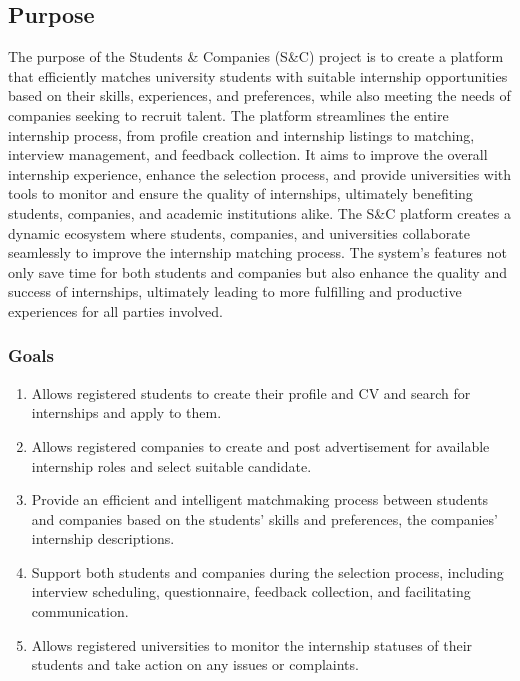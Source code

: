 \subsection{Purpose}
The purpose of the Students \& Companies (S\&C) project is to create a platform that efficiently matches university students with suitable internship opportunities based on their skills, experiences, and preferences, while also meeting the needs of companies seeking to recruit talent. The platform streamlines the entire internship process, from profile creation and internship listings to matching, interview management, and feedback collection. It aims to improve the overall internship experience, enhance the selection process, and provide universities with tools to monitor and ensure the quality of internships, ultimately benefiting students, companies, and academic institutions alike.
\newline The S\&C platform creates a dynamic ecosystem where students, companies, and universities collaborate seamlessly to improve the internship matching process. The system's features not only save time for both students and companies but also enhance the quality and success of internships, ultimately leading to more fulfilling and productive experiences for all parties involved.
\subsubsection{Goals}
\begin{enumerate}[label=G{\arabic*}]
\item
Allows registered students to create their profile and CV and search for internships and apply to them.
\item
Allows registered companies to create and post advertisement for available internship roles and select suitable candidate.
\item 
Provide an efficient and intelligent matchmaking process between students and companies based on the students' skills and preferences, the companies' internship descriptions.
\item
Support both students and companies during the selection process, including interview scheduling, questionnaire, feedback collection, and facilitating communication.
\item
Allows registered universities to monitor the internship statuses of their students and take action on any issues or complaints.

\end{enumerate}


